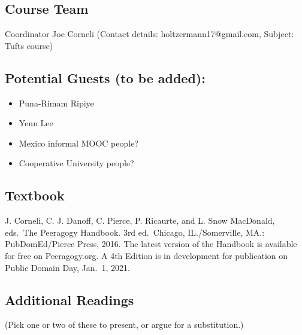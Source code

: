 \hypertarget{course-team}{%
\subsection{Course Team}\label{course-team}}

Coordinator Joe Corneli (Contact details: holtzermann17@gmail.com,
Subject: Tufts course)

\hypertarget{potential-guests-to-be-added}{%
\subsection{Potential Guests (to be
added):}\label{potential-guests-to-be-added}}

\begin{itemize}
\tightlist
\item
  Puna-Rimam Ripiye
\item
  Yenn Lee
\item
  Mexico informal MOOC people?
\item
  Cooperative University people?
\end{itemize}

\hypertarget{textbook}{%
\subsection{Textbook}\label{textbook}}

J. Corneli, C. J. Danoff, C. Pierce, P. Ricaurte, and L. Snow MacDonald,
eds.~The Peeragogy Handbook. 3rd ed.~Chicago, IL./Somerville, MA.:
PubDomEd/Pierce Press, 2016. The latest version of the Handbook is
available for free on Peeragogy.org. A 4th Edition is in development for
publication on Public Domain Day, Jan.~1, 2021.

\hypertarget{additional-readings}{%
\subsection{Additional Readings}\label{additional-readings}}

(Pick one or two of these to present, or argue for a substitution.)

